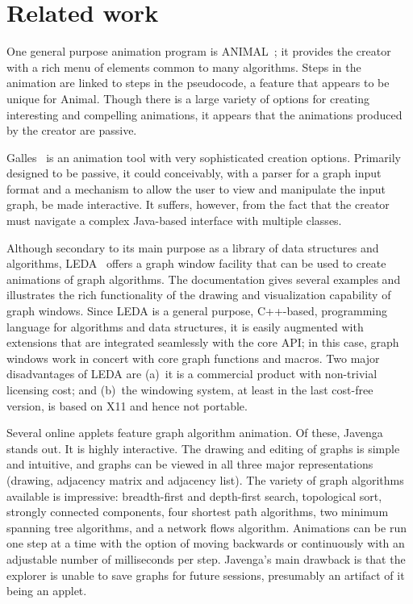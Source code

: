 \section{Related work}\label{sec:related_work}



One general purpose animation program is ANIMAL~\cite{2002-JVLC-Roessling,ANIMAL};
it provides the creator
with a rich menu
of elements common to many algorithms.
Steps in the animation are linked to steps in the pseudocode, a feature that
appears to be unique for Animal.
Though there is a large variety of options for creating interesting and
compelling animations,
it appears that the animations produced by the creator are passive.

Galles~\cite{Galles} is an animation tool with very
sophisticated creation options.
Primarily designed to be passive, it could conceivably, with a parser
for a graph input format and a mechanism to allow the user to view and
manipulate the input graph, be made interactive.
It suffers, however, from the fact that the
creator must navigate a complex Java-based interface with multiple classes.

Although secondary to its main purpose as a library of data structures and
algorithms,
LEDA~\cite{1999-LEDA-Mehlhorn} offers a graph window facility that can be
used to create animations of graph algorithms.
The documentation gives several examples and illustrates the rich functionality of
the drawing and visualization capability of graph windows.
Since LEDA is a general purpose, C++-based, programming language for
algorithms and data structures, it is easily augmented with extensions that
are integrated seamlessly with the core API; in this case, graph windows work
in concert with core graph functions and macros.
Two major disadvantages of LEDA are (a)~it is a commercial product with
non-trivial licensing cost; and (b)~the windowing
system, at least in the last cost-free version, is based on X11 and hence not
portable.

Several online applets feature graph algorithm animation. Of these,
Javenga~\cite{JAVENGA} stands out. It is highly interactive. The drawing and
editing of
graphs is simple and intuitive, and graphs can be viewed in all three major
representations (drawing, adjacency matrix and adjacency list).
The variety of graph algorithms available is impressive:
breadth-first and depth-first search, topological sort, strongly connected
components, four shortest path algorithms, two minimum spanning tree
algorithms, and a network flows algorithm.
Animations can be run one step at a time with the option of moving backwards
or continuously with an adjustable number of milliseconds per step.
Javenga's main drawback is that the explorer is unable to save graphs for
future sessions, presumably an artifact of it being an applet.

